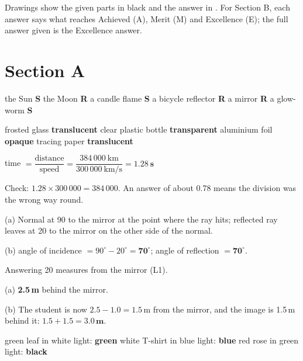 \documentclass[11pt]{article}
\begin{document}
Drawings show the given parts in black and the answer in . For Section B, each answer says what reaches Achieved (A), Merit (M) and Excellence (E); the full answer given is the Excellence answer.

\section*{Section A}
 the Sun \textbf{S} \quad the Moon \textbf{R} \quad a candle flame \textbf{S} \quad a bicycle reflector \textbf{R} \quad a mirror \textbf{R} \quad a glow-worm \textbf{S}

 frosted glass \textbf{translucent} \quad clear plastic bottle \textbf{transparent} \quad aluminium foil \textbf{opaque} \quad tracing paper \textbf{translucent}

 time $= \dfrac{\text{distance}}{\text{speed}} = \dfrac{384\,000\ \mathrm{km}}{300\,000\ \mathrm{km/s}} = \mathbf{1.28\ s}$\par
Check: $1.28 \times 300\,000 = 384\,000$. An answer of about 0.78 means the division was the wrong way round.

\begin{minipage}[t]{0.5\textwidth}
\vspace{0pt}
 (a) Normal at 90\textdegree{} to the mirror at the point where the ray hits; reflected ray leaves at 20\textdegree{} to the mirror on the other side of the normal.\par
(b) angle of incidence $= 90^\circ - 20^\circ = \mathbf{70^\circ}$; angle of reflection $= \mathbf{70^\circ}$.\par
Answering 20\textdegree{} measures from the mirror (L1).
\end{minipage}\hfill
\begin{minipage}[t]{0.46\textwidth}
\vspace{0pt}\centering{}
\end{minipage}

 (a) \textbf{2.5\,m} behind the mirror.\par
(b) The student is now $2.5 - 1.0 = 1.5$\,m from the mirror, and the image is 1.5\,m behind it: $1.5 + 1.5 = \mathbf{3.0\,m}$.

 green leaf in white light: \textbf{green} \quad white T-shirt in blue light: \textbf{blue} \quad red rose in green light: \textbf{black}
\end{document}
